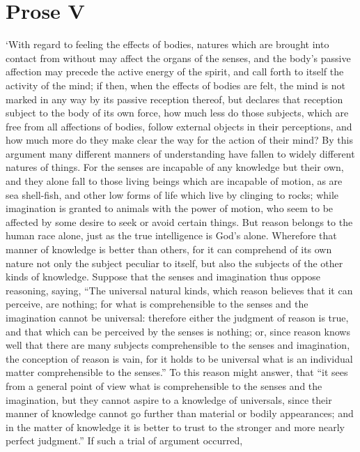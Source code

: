 \section{Prose V}

`With regard to feeling the effects of bodies, natures which are
brought into contact from without may affect the organs of the senses,
and the body's passive affection may precede the active energy of the
spirit, and call forth to itself the activity of the mind; if then,
when the effects of bodies are felt, the mind is not marked in any way
by its passive reception thereof, but declares that reception subject
to the body of its own force, how much less do those subjects, which
are free from all affections of bodies, follow external objects in
their perceptions, and how much more do they make clear the way for
the action of their mind? By this argument many different manners of
understanding have fallen to widely different natures of things. For
the senses are incapable of any knowledge but their own, and they
alone fall to those living beings which are incapable of motion, as
are sea shell-fish, and other low forms of life which live by clinging
to rocks; while imagination is granted to animals with the power of
motion, who seem to be affected by some desire to seek or avoid
certain things.  But reason belongs to the human race alone,
just as the true intelligence is God's alone. Wherefore that manner of
knowledge is better than others, for it can comprehend of its own
nature not only the subject peculiar to itself, but also the subjects
of the other kinds of knowledge. Suppose that the senses and
imagination thus oppose reasoning, saying, ``The universal natural
kinds, which reason believes that it can perceive, are nothing; for
what is comprehensible to the senses and the imagination cannot be
universal: therefore either the judgment of reason is true, and that
which can be perceived by the senses is nothing; or, since reason
knows well that there are many subjects comprehensible to the senses
and imagination, the conception of reason is vain, for it holds to be
universal what is an individual matter comprehensible to the senses.''
To this reason might answer, that ``it sees from a general point of
view what is comprehensible to the senses and the imagination, but
they cannot aspire to a knowledge of universals, since their manner of
knowledge cannot go further than material or bodily appearances; and
in the matter of knowledge it is better to trust to the stronger and
more nearly perfect judgment.'' If such a trial of argument occurred,
